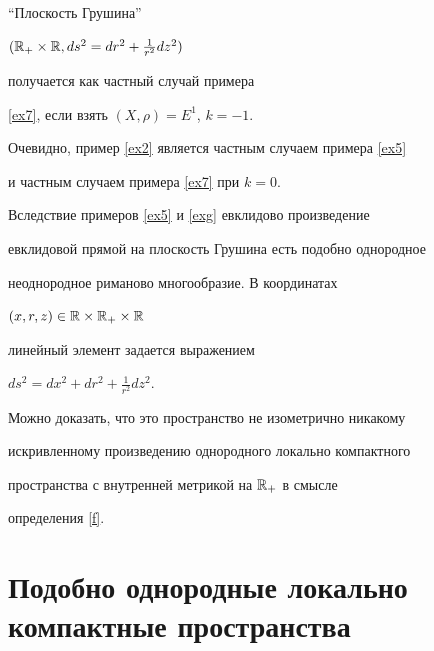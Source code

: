 




\begin{exams}


\label{exg}


``Плоскость Грушина''


$(\Bbb{R}_{+} \times \Bbb{R}, ds^{2}= dr^{2}+ \frac{1}{r^{2}}dz^{2})$


\cite{Gr} получается как частный случай примера


\ref{ex7}, если взять $(X,\rho)=E^{1}$, $k=-1$.


\end{exams}





\begin{notes}


Очевидно, пример \ref{ex2} является частным случаем примера \ref{ex5}


и частным случаем примера \ref{ex7} при $k=0$.


\end{notes}





\begin{exams}


\label{cex}


Вследствие примеров \ref{ex5} и \ref{exg} евклидово произведение


евклидовой прямой на плоскость Грушина есть подобно однородное


неоднородное риманово многообразие. В координатах


$(x,r,z) \in \Bbb{R}\times \Bbb{R}_{+}\times \Bbb{R}$


линейный элемент задается выражением


$ds^{2}= dx^{2}+ dr^{2}+ \frac{1}{r^{2}}dz^{2}$.


Можно доказать, что это пространство не изометрично никакому


искривленному произведению однородного локально компактного


пространства с внутренней метрикой на $\Bbb{R}_{+}$ в смысле


определения \ref{f}.


\end{exams}








\section{Подобно однородные локально компактные пространства}





